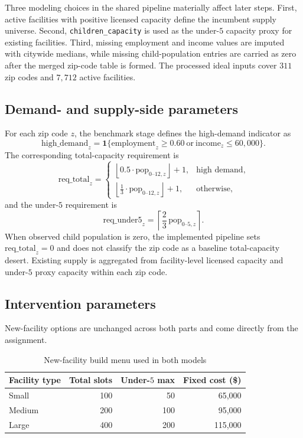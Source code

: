 \documentclass[11pt]{article}
\begin{document}
Three modeling choices in the shared pipeline materially affect later steps. First, active facilities with positive licensed capacity define the incumbent supply universe. Second, \texttt{children\_capacity} is used as the under-\(5\) capacity proxy for existing facilities. Third, missing employment and income values are imputed with citywide medians, while missing child-population entries are carried as zero after the merged zip-code table is formed. The processed ideal inputs cover \(311\) zip codes and \(7{,}712\) active facilities.

\subsection{Demand- and supply-side parameters}

For each zip code \(z\), the benchmark stage defines the high-demand indicator as
\[
\text{high\_demand}_z =
\mathbf{1}\{\text{employment}_z \ge 0.60 \ \text{or}\ \text{income}_z \le 60{,}000\}.
\]
The corresponding total-capacity requirement is
\[
\mathrm{req\_total}_z =
\begin{cases}
\left\lfloor 0.5 \cdot \mathrm{pop}_{0\text{--}12,z} \right\rfloor + 1, & \text{high demand},\\[0.5ex]
\left\lfloor \frac{1}{3} \cdot \mathrm{pop}_{0\text{--}12,z} \right\rfloor + 1, & \text{otherwise},
\end{cases}
\]
and the under-\(5\) requirement is
\[
\mathrm{req\_under5}_z = \left\lceil \frac{2}{3}\,\mathrm{pop}_{0\text{--}5,z} \right\rceil.
\]
When observed child population is zero, the implemented pipeline sets \(\mathrm{req\_total}_z=0\) and does not classify the zip code as a baseline total-capacity desert. Existing supply is aggregated from facility-level licensed capacity and under-\(5\) proxy capacity within each zip code.

\subsection{Intervention parameters}

New-facility options are unchanged across both parts and come directly from the assignment.

\begin{table}[H]
\centering
\small
\begin{tabular}{lrrr}
\toprule
\textbf{Facility type} & \textbf{Total slots} & \textbf{Under-\(5\) max} & \textbf{Fixed cost (\$)} \\
\midrule
Small & 100 & 50 & 65,000 \\
Medium & 200 & 100 & 95,000 \\
Large & 400 & 200 & 115,000 \\
\bottomrule
\end{tabular}
\caption{New-facility build menu used in both models}
\label{tab:build-menu}
\end{table}
\end{document}
